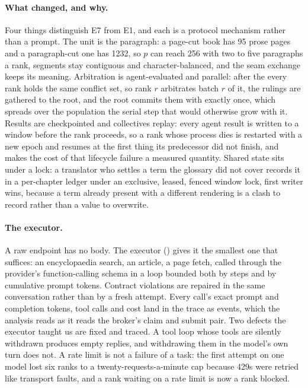 \paragraph{What changed, and why.} Four things distinguish E7 from E1, and each
is a protocol mechanism rather than a prompt. The unit is the paragraph: a
page-cut book has 95 prose pages and a paragraph-cut one has 1232, so $p$ can
reach 256 with two to five paragraphs a rank, segments stay contiguous and
character-balanced, and the seam exchange keeps its meaning. Arbitration is
agent-evaluated and parallel: after the  every rank holds the
same conflict set, so rank $r$ arbitrates batch $r$ of it, the rulings are
gathered to the root, and the root commits them with 
exactly once, which spreads over the population the serial step that would
otherwise grow with it. Results are checkpointed and collectives replay: every
agent result is written to a window before the rank proceeds, so a rank whose
process dies is restarted with a new epoch and resumes at the first thing its
predecessor did not finish, and  makes the cost of that
lifecycle failure a measured quantity. Shared state sits under a lock: a
translator who settles a term the glossary did not cover records it in a
per-chapter ledger under an exclusive, leased, fenced window lock, first writer
wins, because a term already present with a different rendering is a clash to
record rather than a value to overwrite.

\paragraph{The executor.} A raw endpoint has no body. The executor
() gives it the smallest one that suffices: an
encyclopaedia search, an article, a page fetch, called through the provider's
function-calling schema in a loop bounded both by steps and by cumulative prompt
tokens. Contract violations are repaired in the same conversation rather than by
a fresh attempt. Every call's exact prompt and completion tokens, tool calls and
cost land in the trace as  events, which the analysis reads as it
reads the broker's claim and submit pair. Two defects the executor taught us are
fixed and traced. A tool loop whose tools are silently withdrawn produces empty
replies, and withdrawing them in the model's own turn does not. A rate limit is
not a failure of a task: the first attempt on one model lost six ranks to a
twenty-requests-a-minute cap because 429s were retried like transport faults,
and a rank waiting on a rate limit is now a rank blocked.

